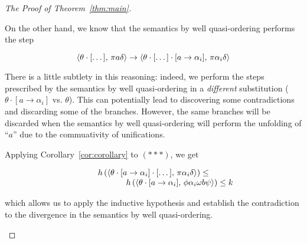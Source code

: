 \begin{proof}[The Proof of Theorem~\ref{thm:main}]
\begin{enumerate}
    On the other hand, we know that the semantics by well quasi-ordering performs the step

    \[
    \langle \theta\cdot[\dots],\,\pi a \delta \rangle\to\langle \theta\cdot[\dots]\cdot[a\to\alpha_i],\,\pi \alpha_i \delta \rangle
    \]

    There is a little subtlety in this reasoning: indeed, we perform the steps prescribed by the semantics
    by well quasi-ordering in a \emph{different} substitution ($\theta\cdot[a\to\alpha_i]$ vs. $\theta$). This
    can potentially lead to discovering some contradictions and discarding some of the branches. However, the same
    branches will be discarded when the semantics by well quasi-ordering will perform the unfolding of ``$a$''
    due to the commuativity of unifications.

    Applying Corollary~\ref{cor:corollary} to $(***)$, we get

    \[
    \begin{array}{c}
      h\,(\langle \theta\cdot[a\to\alpha_i]\cdot[\dots],\,\pi\alpha_i\delta \rangle)\le \\
      \phantom{XXXXXXX}h\,(\langle \theta\cdot[a\to\alpha_i],\,\phi \alpha_i \omega b \psi \rangle) \le k
    \end{array}
    \]

    which allows us to apply the inductive hypothesis and establish the contradiction to the divergence in the
    semantics by well quasi-ordering.
  \end{enumerate}  
  
\end{proof}
